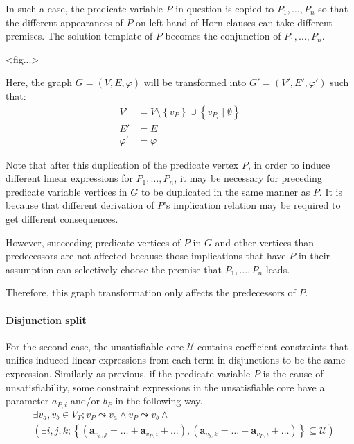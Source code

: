 In such a case, the predicate variable $P$ in question is copied to
$P_1, \ldots, P_n$ so that the different appearances of $P$ on
left-hand of Horn clauses can take different premises.  The solution
template of $P$ becomes the conjunction of $P_1, \ldots, P_n$.

<fig...>

Here, the graph $G=(V,E,\varphi)$ will be transformed into
$G'=(V',E',\varphi')$ such that:
\begin{align*}
V' & = V \setminus \left\lbrace v_P \right\rbrace \cup
  \left\lbrace v_{P_i} \mid \emptyset \right\rbrace \\
E' & = E \\
\varphi' & = \varphi
\end{align*}

Note that after this duplication of the predicate vertex $P$, in order
to induce different linear expressions for $P_1, \ldots, P_n$, it may
be necessary for preceding predicate variable vertices in $G$ to be
duplicated in the same manner as $P$. It is because that different
derivation of $P$'s implication relation may be required to get
different consequences.

However, succeeding predicate vertices of $P$ in $G$ and other
vertices than predecessors are not affected because those implications
that have $P$ in their assumption can selectively choose the premise
that $P_1, \ldots, P_n$ leads.

Therefore, this graph transformation only affects the predecessors of
$P$.

\paragraph{Disjunction split}
For the second case, the unsatisfiable core $\mathcal{U}$ contains
coefficient constraints that unifies induced linear expressions from
each term in disjunctions to be the same expression.  Similarly as
previous, if the predicate variable $P$ is the cause of
unsatisfiability, some constraint expressions in the unsatisfiable
core have a parameter $a_{P,i}$ and/or $b_P$ in the following way.
\begin{align*}
& \exists v_a, v_b \in V_T; v_P \leadsto v_a \wedge v_P \leadsto v_b \wedge \\
& \left( \exists i, j, k;
\left\lbrace \left( \mathbf{a}_{v_a,j} = \ldots + \mathbf{a}_{v_P,i} + \ldots \right),
\left( \mathbf{a}_{v_b,k} = \ldots + \mathbf{a}_{v_P,i} + \ldots \right)
\right\rbrace \subseteq \mathcal{U} \right)
\end{align*}

